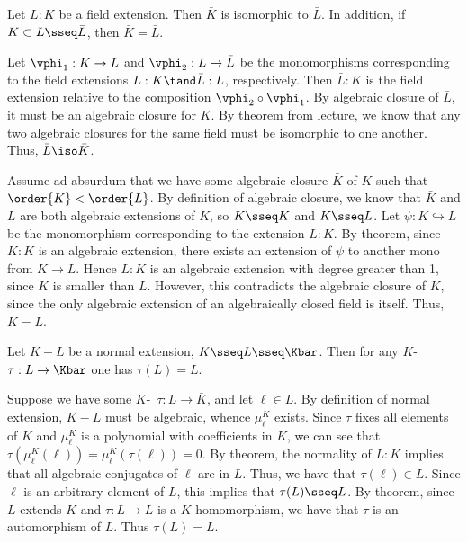 \documentclass{article}
\begin{document}
\begin{exercise} %
  Let \( L:K \) be a field extension. Then \( \bar K \) is isomorphic to \( \bar L \).
  In addition, if \( K\subset L \sseq \bar L \), then \( \bar K = \bar L \).
\end{exercise}
\begin{solution}
  Let \( \vphi_1:K\to L \) and \( \vphi_2:L\to \bar L \) be the monomorphisms corresponding to the field extensions \( L:K \tand \bar L:L \), respectively.
  Then \( \bar L:K \) is the field extension relative to the composition \( \vphi_2\circ \vphi_1 \).
  By algebraic closure of \( \bar L \), it must be an algebraic closure for \( K \).
  By theorem from lecture, we know that any two algebraic closures for the same field must be isomorphic to one another.
  Thus, \( \bar L\iso \bar K \).

  Assume ad absurdum that we have some algebraic closure \( \bar K \) of \( K \) such that \( \order{\bar K} < \order{\bar L} \).
  By definition of algebraic closure, we know that \( \bar K \) and \( \bar L \) are both algebraic extensions of \( K \), so \( K\sseq \bar K \) and \( K\sseq \bar L \).
  Let \( \psi:K\hookrightarrow\bar L \) be the monomorphism corresponding to the extension \( \bar L:K \).
  By theorem, since \( \bar K:K \) is an algebraic extension, there exists an extension of \( \psi \) to another mono from \( \bar K \to \bar L \).
  Hence \( \bar L:\bar K \) is an algebraic extension with degree greater than 1, since \( \bar K \) is smaller than \( \bar L \).
  However, this contradicts the algebraic closure of \( \bar K \), since the only algebraic extension of an algebraically closed field is itself.
  Thus, \( \bar K = \bar L \).
\end{solution}

\begin{exercise} %
  Let \( K-L \) be a normal extension, \( K\sseq L\sseq \Kbar \).
  Then for any \( K \)-\homo~\( \tau:L\to \Kbar \) one has \( \tau(L) = L \).
\end{exercise}
\begin{solution}
  Suppose we have some \( K \)-\homo~\( \tau:L\to\bar K \), and let \( \ell\in L \).
  By definition of normal extension, \( K-L \) must be algebraic, whence \( \mu_\ell^K \) exists.
  Since \( \tau \) fixes all elements of \( K \) and \( \mu_\ell^K \) is a polynomial with coefficients in \( K \), we can see that \( \tau(\mu_\ell^K(\ell)) = \mu_\ell^K(\tau(\ell)) = 0 \).
  By theorem, the normality of \( L:K \) implies that all algebraic conjugates of \( \ell \) are in \( L \).
  Thus, we have that \( \tau(\ell)\in L \).
  Since \( \ell \) is an arbitrary element of \( L \), this implies that \( \tau(L) \sseq L \).
  By theorem, since \( L \) extends \( K \) and \( \tau:L\to L \) is a \( K \)-homomorphism, we have that \( \tau \) is an automorphism of \( L \).
  Thus \( \tau(L) = L \).
\end{solution}
\end{document}
